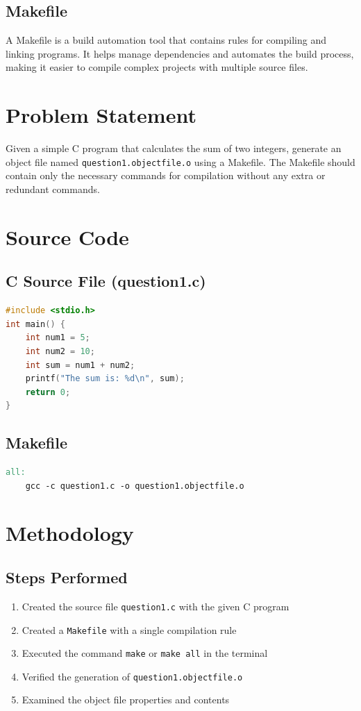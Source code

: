 \documentclass[12pt,a4paper]{article}
\begin{document}
\subsection{Makefile}
A Makefile is a build automation tool that contains rules for compiling and linking programs. It helps manage dependencies and automates the build process, making it easier to compile complex projects with multiple source files.

\section{Problem Statement}
Given a simple C program that calculates the sum of two integers, generate an object file named \texttt{question1.objectfile.o} using a Makefile. The Makefile should contain only the necessary commands for compilation without any extra or redundant commands.

\section{Source Code}

\subsection{C Source File (question1.c)}
\begin{lstlisting}[language=C, caption={question1.c - Simple Addition Program}]
#include <stdio.h>  
int main() { 
    int num1 = 5; 
    int num2 = 10; 
    int sum = num1 + num2; 
    printf("The sum is: %d\n", sum);  
    return 0; 
}
\end{lstlisting}

\subsection{Makefile}
\begin{lstlisting}[language=make, caption={Makefile for Object File Generation}]
all:
	gcc -c question1.c -o question1.objectfile.o
\end{lstlisting}

\section{Methodology}

\subsection{Steps Performed}
\begin{enumerate}
    \item Created the source file \texttt{question1.c} with the given C program
    \item Created a \texttt{Makefile} with a single compilation rule
    \item Executed the command \texttt{make} or \texttt{make all} in the terminal
    \item Verified the generation of \texttt{question1.objectfile.o}
    \item Examined the object file properties and contents
\end{enumerate}
\end{document}
